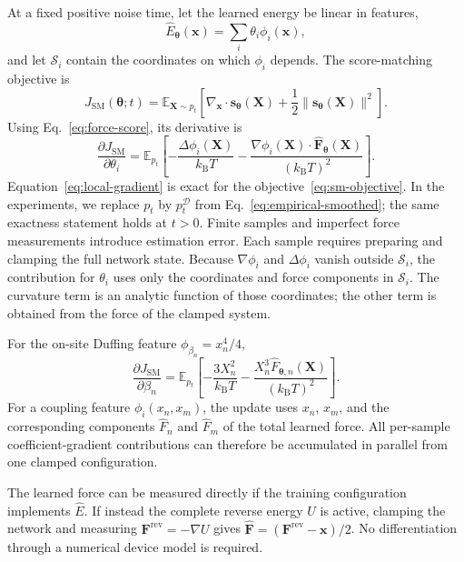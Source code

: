 \documentclass[referee,lineno,pdflatex,sn-nature]{sn-jnl}
\newcommand{\kBT}{k_{\mathrm B}T}
\newcommand{\vect}[1]{\boldsymbol{#1}}
\newcommand{\Ehat}{\widehat E}
\newcommand{\Fhat}{\widehat{\vect F}}
\begin{document}
At a fixed positive noise time, let the learned energy be linear in features,
\begin{equation}\label{eq:feature-energy}
  \Ehat_{\vect\theta}(\vect x)=\sum_i\theta_i\phi_i(\vect x),
\end{equation}
and let $\mathcal S_i$ contain the coordinates on which $\phi_i$ depends. The score-matching objective is \cite{hyvarinen2005scorematching}
\begin{equation}\label{eq:sm-objective}
 J_{\mathrm{SM}}(\vect\theta;t)=
 \mathbb E_{\vect X\sim p_t}\left[
 \nabla_{\vect x}\!\cdot\vect s_{\vect\theta}(\vect X)
 +\frac{1}{2}\lVert\vect s_{\vect\theta}(\vect X)\rVert^2\right].
\end{equation}
Using Eq.~\eqref{eq:force-score}, its derivative is
\begin{equation}\label{eq:local-gradient}
 \frac{\partial J_{\mathrm{SM}}}{\partial\theta_i}
 =\mathbb E_{p_t}\left[
 -\frac{\Delta\phi_i(\vect X)}{\kBT}
 -\frac{\nabla\phi_i(\vect X)\cdot\Fhat_{\vect\theta}(\vect X)}
 {(\kBT)^2}\right].
\end{equation}
Equation~\eqref{eq:local-gradient} is exact for the
objective~\eqref{eq:sm-objective}. In the experiments, we replace $p_t$ by
$p_t^{\mathcal D}$ from Eq.~\eqref{eq:empirical-smoothed}; the same exactness
statement holds at $t>0$. Finite samples and imperfect force measurements
introduce estimation error. Each sample requires preparing and clamping the full
network state. Because $\nabla\phi_i$ and $\Delta\phi_i$ vanish outside $\mathcal S_i$,
the contribution for $\theta_i$ uses only the coordinates and force components in
$\mathcal S_i$. The curvature term is an analytic function of those coordinates;
the other term is obtained from the force of the clamped system.

For the on-site Duffing feature $\phi_{\beta_n}=x_n^4/4$,
\begin{equation}\label{eq:duffing-gradient}
 \frac{\partial J_{\mathrm{SM}}}{\partial\beta_n}
 =\mathbb E_{p_t}\left[-\frac{3X_n^2}{\kBT}
 -\frac{X_n^3\widehat F_{\vect\theta,n}(\vect X)}{(\kBT)^2}\right].
\end{equation}
For a coupling feature $\phi_i(x_n,x_m)$, the update uses $x_n$, $x_m$, and the
corresponding components $\widehat F_n$ and $\widehat F_m$ of the total learned
force. All per-sample coefficient-gradient contributions can therefore be
accumulated in parallel from one clamped configuration.

The learned force can be measured directly if the training configuration implements
$\Ehat$. If instead the complete reverse energy $U$ is active, clamping the network
and measuring $\vect F^{\mathrm{rev}}=-\nabla U$ gives
$\Fhat=(\vect F^{\mathrm{rev}}-\vect x)/2$. No differentiation through a numerical
device model is required.
\end{document}

